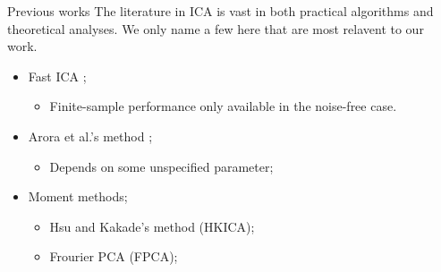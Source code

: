 \documentclass[final]{beamer} %
\begin{document}
\begin{frame}[c]
\begin{columns}[t,totalwidth=\textwidth]
\begin{column}{.24\textwidth}
		\begin{block}{Previous works}
			The literature in ICA is vast in both practical algorithms and theoretical analyses. We only name a few here that are most relavent to our work.
			\begin{itemize}
				\item Fast ICA \citep{hyvarinen1999fast};
				\begin{itemize}
					\item Finite-sample performance only available in the noise-free case.   
				\end{itemize}
				\item Arora et al.'s method \citep{arora2012provable};
				\begin{itemize}
					\item Depends on some unspecified parameter;
				\end{itemize} 
				\item Moment methods;
				\begin{itemize}
					\item Hsu and Kakade's method  \citep{hsu2013learning} (HKICA);
					\item Frourier PCA \citep{goyal2014fourier} (FPCA);
				\end{itemize}
			\end{itemize}
		\end{block}

	\end{column}
	\begin{column}{0.01\textwidth}
	\end{column}
	

\end{columns}
\end{frame}
\end{document}

